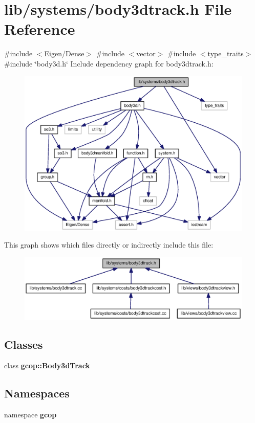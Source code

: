 \section{lib/systems/body3dtrack.h \-File \-Reference}
\label{body3dtrack_8h}
{\ttfamily \#include $<$\-Eigen/\-Dense$>$}\*
{\ttfamily \#include $<$vector$>$}\*
{\ttfamily \#include $<$type\-\_\-traits$>$}\*
{\ttfamily \#include \char`\"{}body3d.\-h\char`\"{}}\*
\-Include dependency graph for body3dtrack.\-h\-:
\nopagebreak
\begin{figure}[H]
\begin{center}
\leavevmode
\includegraphics[width=350pt]{body3dtrack_8h__incl}
\end{center}
\end{figure}
\-This graph shows which files directly or indirectly include this file\-:
\nopagebreak
\begin{figure}[H]
\begin{center}
\leavevmode
\includegraphics[width=350pt]{body3dtrack_8h__dep__incl}
\end{center}
\end{figure}
\subsection*{\-Classes}
\begin{DoxyCompactItemize}
\item 
class {\bf gcop\-::\-Body3d\-Track}
\end{DoxyCompactItemize}
\subsection*{\-Namespaces}
\begin{DoxyCompactItemize}
\item 
namespace {\bf gcop}
\end{DoxyCompactItemize}
